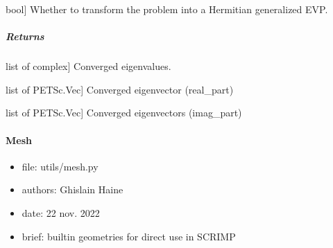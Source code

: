 \documentclass[letterpaper,10pt,english]{sphinxmanual}
\begin{document}
\begin{fulllineitems}
\begin{description}
\sphinxlineitem{transform\_hermitian}{[}bool{]}
\sphinxAtStartPar
Whether to transform the problem into a Hermitian generalized EVP.

\end{description}


\subparagraph{Returns}
\label{\detokenize{scrimp.utils:id2}}\begin{description}
\sphinxlineitem{eigval}{[}list of complex{]}
\sphinxAtStartPar
Converged eigenvalues.

\sphinxlineitem{eigvec\_r}{[}list of PETSc.Vec{]}
\sphinxAtStartPar
Converged eigenvector (real\_part)

\sphinxlineitem{eigvec\_i}{[}list of PETSc.Vec{]}
\sphinxAtStartPar
Converged eigenvectors (imag\_part)

\end{description}

\end{fulllineitems}



\paragraph{Mesh}
\label{\detokenize{scrimp.utils:module-scrimp.utils.mesh}}\label{\detokenize{scrimp.utils:mesh}}\begin{itemize}
\item {} 
\sphinxAtStartPar
file:             utils/mesh.py

\item {} 
\sphinxAtStartPar
authors:          Ghislain Haine

\item {} 
\sphinxAtStartPar
date:             22 nov. 2022

\item {} 
\sphinxAtStartPar
brief:            built\sphinxhyphen{}in geometries for direct use in SCRIMP

\end{itemize}
\end{document}
